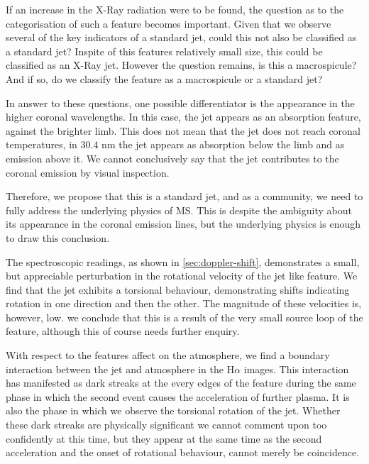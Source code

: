 If an increase in the X-Ray radiation were to be found, the question as to the categorisation of such a feature becomes important.
Given that we observe several of the key indicators of a standard jet, could this not also be classified as a standard jet? 
Inspite of this features relatively small size, this could be classified as an X-Ray jet.
However the question remains, is this a macrospicule?
And if so, do we classify the feature as a macrospicule or a standard jet?

In answer to these questions, one possible differentiator is the appearance in the higher coronal wavelengths.
In this case, the jet appears as an absorption feature, against the brighter limb.
This does not mean that the jet does not reach coronal temperatures, in $30.4$ nm the jet appears as absorption below the limb and as emission above it.
We cannot conclusively say that the jet contributes to the coronal emission by visual inspection.

Therefore, we propose that this is a standard jet, and as a community, we need to fully address the underlying physics of MS.
This is despite the ambiguity about its appearance in the coronal emission lines, but the underlying physics is enough to draw this conclusion.

The spectroscopic readings, as shown in \cref{sec:doppler-shift}, demonstrates a small, but appreciable perturbation in the rotational velocity of the jet like feature.
We find that the jet exhibits a torsional behaviour, demonstrating shifts indicating rotation in one direction and then the other.
The magnitude of these velocities is, however, low.
we conclude that this is a result of the very small source loop of the feature, although this of course needs further enquiry. 

With respect to the features affect on the atmosphere, we find a boundary interaction between the jet and atmosphere in the H$\alpha$ images.
This interaction has manifested as dark streaks at the every edges of the feature during the same phase in which the second event causes the acceleration of further plasma.
It is also the phase in which we observe the torsional rotation of the jet.
Whether these dark streaks are physically significant we cannot comment upon too confidently at this time, but they appear at the same time as the second acceleration and the onset of rotational behaviour, cannot merely be coincidence.
